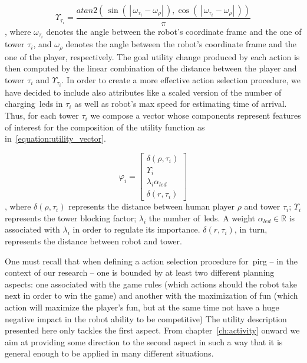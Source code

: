 \begin{equation}\label{equation:utility_function}
\Upsilon_{\tau_{i}} = \frac{atan2(\,
\sin(\,\left|\, \omega_{\tau_{i}}-\omega_{\rho}\right|\,),
\cos(\,\left|\,\omega_{\tau_{i}}-\omega_{\rho}\right|\,))}{\pi}
\end{equation}
, where $\omega_{\tau_{i}}$ denotes the angle between the robot's coordinate frame and the one of tower $\tau_{i}$, and $\omega_{\rho}$ denotes the angle between the robot's coordinate frame and the one of the player, respectively. The goal utility change produced by each action is then computed by the linear combination of the distance between the player and tower $\tau_{i}$ and $\Upsilon_{\tau_{i}}$. In order to create a more effective action selection procedure, we have decided to include also attributes like a scaled version of the number of charging~\gls{led}s in $\tau_{i}$ as well as robot's max speed for estimating time of arrival. Thus, for each tower $\tau_{i}$ we compose a vector whose components represent features of interest for the composition of the utility function as in~\ref{equation:utility_vector}.
 
\begin{equation}\label{equation:utility_vector}
\varphi_{i} = 
\begin{bmatrix}
    \delta(\rho,\tau_{i}) \\
    \Upsilon_{i}\\
    \lambda_{i}\alpha_{led}\\
    \delta(r,\tau_{i})
\end{bmatrix}
\end{equation}
, where $\delta(\rho,\tau_{i})$ represents the distance between human player $\rho$ and tower $\tau_{i}$; $\Upsilon_{i}$ represents the tower blocking factor; $\lambda_{i}$ the number of~\gls{led}s. A weight $\alpha_{led} \in \mathbb{R}$ is associated with $\lambda_{i}$ in order to regulate its importance. $\delta(r,\tau_{i})$, in turn, represents the distance between robot and tower.

One must recall that when defining a action selection procedure for~\gls{pirg} -- in the context of our research -- one is bounded by at least two different planning aspects: one associated with the game rules (which actions should the robot take next in order to win the game) and another with the maximization of fun (which action will maximize the player's fun, but at the same time not have a huge negative impact in the robot ability to be competitive) The utility description presented here only tackles the first aspect. From chapter~\ref{ch:activity} onward we aim at providing some direction to the second aspect in such a way that it is general enough to be applied in many different situations. 

